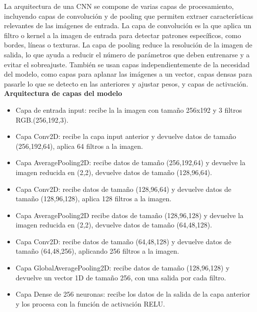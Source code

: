 \documentclass[colorinlistoftodos,twoside,twocolumn,10pt]{article} %
\begin{document}
La arquitectura de una CNN se compone de varias capas de procesamiento, incluyendo capas de convolución y de pooling que permiten extraer características relevantes de las imágenes de entrada. La capa de convolución es la que aplica un filtro o kernel a la imagen de entrada para detectar patrones específicos, como bordes, líneas o texturas. La capa de pooling reduce la resolución de la imagen de salida, lo que ayuda a reducir el número de parámetros que deben entrenarse y a evitar el sobreajuste. También se usan capas independientemente de la necesidad del modelo, como capas para aplanar las imágenes a un vector, capas densas para pasarle lo que se detecto en las anteriores y ajustar pesos, y capas de activación.\\

\textbf{\large Arquitectura de capas del modelo}
\begin{itemize}
\item Capa de entrada input: recibe la la imagen con tamaño 256x192 y 3 filtros RGB.(256,192,3).

\item Capa Conv2D: recibe la capa input anterior y devuelve datos de tamaño (256,192,64), aplica 64 filtros a la imagen.

\item Capa AveragePooling2D: recibe datos de tamaño (256,192,64) y devuelve la imagen reducida en (2,2), devuelve datos de tamaño (128,96,64).

\item Capa Conv2D: recibe datos de tamaño (128,96,64) y devuelve datos de tamaño (128,96,128), aplica 128 filtros a la imagen.

\item Capa AveragePooling2D recibe datos de tamaño (128,96,128) y devuelve la imagen reducida en (2,2), devuelve datos de tamaño (64,48,128).

\item Capa Conv2D: recibe datos de tamaño (64,48,128) y devuelve datos de tamaño (64,48,256), aplicando 256 filtros a la imagen.

\item Capa GlobalAveragePooling2D: recibe datos de tamaño (128,96,128) y devuelve un vector 1D \cite{Machine Learning and Deep Learning methods for music genre Classification} de tamaño 256, con una salida por cada filtro.

\item Capa Dense de 256 neuronas: recibe los datos de la salida de la capa anterior y los procesa con la función de activación RELU.


\end{itemize}
\end{document}

